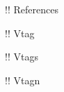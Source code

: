 \documentclass[10pt,a4paper]{article}
\begin{document}
!\gitReferences ! References

!\gitVtag ! Vtag

!\gitVtags ! Vtags

!\gitVtagn ! Vtagn
\end{document}
